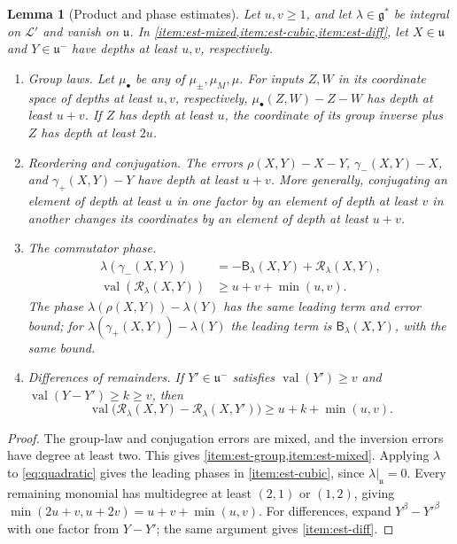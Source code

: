 \documentclass[11pt,reqno]{amsart}
\numberwithin{equation}{section}
\theoremstyle{plain}
\newtheorem{lemma}[theorem]{Lemma}
\theoremstyle{definition}
\theoremstyle{remark}
\theoremstyle{plain}
\newcommand{\Lat}{\mathcal{L}}   %
\newcommand{\g}{\mathfrak{g}}    %
\newcommand{\gd}{\mathfrak{g}^*} %
\newcommand{\uu}{\mathfrak{u}}   %
\DeclareMathOperator{\val}{val}
\newcommand{\lf}{\lambda}
\newcommand{\Bf}{\mathsf{B}}
\begin{document}
\begin{lemma}[Product and phase estimates]\label{lem:estimates}
Let $u,v\ge1$, and let $\lf\in\gd$ be integral on $\Lat'$ and
vanish on $\uu$. In
\cref{item:est-mixed,item:est-cubic,item:est-diff}, let
$X\in\uu$ and $Y\in\uu^-$ have depths at least $u,v$, respectively.
\begin{enumerate}[label=\textup{(\arabic*)},ref=\arabic*]
\item\label{item:est-group} \emph{Group laws.}
Let $\mu_\bullet$ be any of $\mu_\pm,\mu_M,\mu$.
For inputs $Z,W$ in its coordinate space of depths at least $u,v$,
respectively, $\mu_\bullet(Z,W)-Z-W$ has depth at least $u+v$.
If $Z$ has depth at least $u$, the coordinate of its group inverse
plus $Z$ has depth at least $2u$.
\item\label{item:est-mixed} \emph{Reordering and conjugation.}
The errors
$\rho(X,Y)-X-Y$, $\gamma_-(X,Y)-X$, and $\gamma_+(X,Y)-Y$
have depth at least $u+v$. More generally, conjugating an element
of depth at least $u$ in one factor by an element of depth at least
$v$ in another changes its coordinates by an element of depth at
least $u+v$.
\item\label{item:est-cubic} \emph{The commutator phase.}
\begin{equation}\label{eq:mixedphase}
\begin{aligned}
\lf(\gamma_-(X,Y))&=-\Bf_\lf(X,Y)+\mathscr R_\lf(X,Y),\\
\val(\mathscr R_\lf(X,Y))&\ge u+v+\min(u,v).
\end{aligned}
\end{equation}
The phase $\lf(\rho(X,Y))-\lf(Y)$ has the same leading term and
error bound; for $\lf(\gamma_+(X,Y))-\lf(Y)$ the leading term is
$\Bf_\lf(X,Y)$, with the same bound.
\item\label{item:est-diff} \emph{Differences of remainders.}
If $Y'\in\uu^-$ satisfies $\val(Y')\ge v$ and
$\val(Y-Y')\ge k\ge v$, then
\begin{equation}\label{eq:difference}
\val\bigl(\mathscr R_\lf(X,Y)-\mathscr R_\lf(X,Y')\bigr)
\ge u+k+\min(u,v).
\end{equation}
\end{enumerate}
\end{lemma}

\begin{proof}
The group-law and conjugation errors are mixed, and the inversion
errors have degree at least two. This gives
\cref{item:est-group,item:est-mixed}.
Applying $\lf$ to \eqref{eq:quadratic} gives the leading phases in
\cref{item:est-cubic}, since $\lf|_\uu=0$.
Every remaining monomial has multidegree at least $(2,1)$ or $(1,2)$,
giving $\min(2u+v,u+2v)=u+v+\min(u,v)$.
For differences, expand $Y^\beta-Y'^\beta$ with one factor from
$Y-Y'$; the same argument gives \cref{item:est-diff}.
\end{proof}
\end{document}
